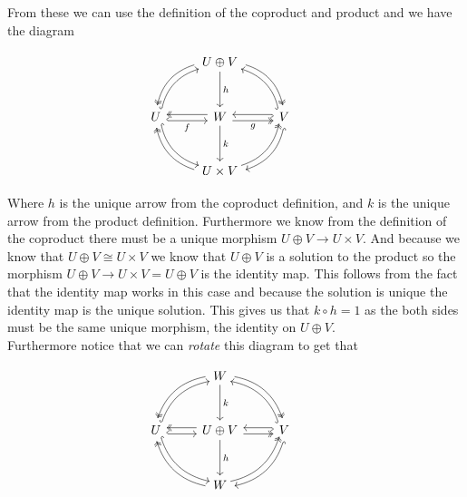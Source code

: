 \documentclass[12pt]{amsart}
\theoremstyle{definition}
\newcommand{\ra}{\rightarrow}
\begin{document}
\begin{enumerate}
    From these we can use the definition of the coproduct and product and we have the diagram

    \[\begin{tikzcd}[row sep=1cm, column sep=.85cm]
     & U\oplus V\arrow[d, "h"]\arrow[dl, twoheadrightarrow, bend right, shift right]\arrow[dr, twoheadrightarrow, bend left, shift left] \\
      U\arrow[dr, hook, bend right, shift left]\arrow[r,hook, shift right, "f"']\arrow[ur, bend left, shift right, hook] & W \arrow[d, "k"]\arrow[l,twoheadrightarrow, shift right]\arrow[r,twoheadrightarrow, shift right, "g"'] & V \arrow[dl, hook, bend left, shift left]\arrow[l,hook, shift right]\arrow[ul, hook, bend right, shift left]&\\
      &U\times V\arrow[ul, twoheadrightarrow, bend left, shift left]\arrow[ur, twoheadrightarrow, bend right, shift left]
    \end{tikzcd}\]
    
Where $h$ is the unique arrow from the coproduct definition, and $k$ is the unique arrow from the product definition. 
Furthermore we know from the definition of the coproduct there must be a unique morphism $U\oplus V\ra U\times V$. 
And because we know that $U\oplus V\cong U\times V$ we know that $U\oplus V$ is a solution to the product so the morphism $U\oplus V\ra U\times V=U\oplus V$ is the identity map. This follows from the fact that the identity map works in this case and because the solution is unique the identity map is the unique solution. This gives us that $k\circ h = 1$ as the both sides must be the same unique morphism, the identity on $U\oplus V$.\\

Furthermore notice that we can \textit{rotate} this diagram to get that

\[\begin{tikzcd}[row sep=1cm, column sep=.85cm]
     &W \arrow[d, "k"]\arrow[dl, twoheadrightarrow, bend right, shift right]\arrow[dr, twoheadrightarrow, bend left, shift left] \\
      U\arrow[dr, hook, bend right, shift left]\arrow[r,hook, shift right]\arrow[ur, bend left, shift right, hook] & U\oplus V \arrow[d, "h"]\arrow[l,twoheadrightarrow, shift right]\arrow[r,twoheadrightarrow, shift right] & V \arrow[dl, hook, bend left, shift left]\arrow[l,hook, shift right]\arrow[ul, hook, bend right, shift left]&\\
      &W\arrow[ul, twoheadrightarrow, bend left, shift left]\arrow[ur, twoheadrightarrow, bend right, shift left]
    \end{tikzcd}\]


\end{enumerate}
\end{document}
